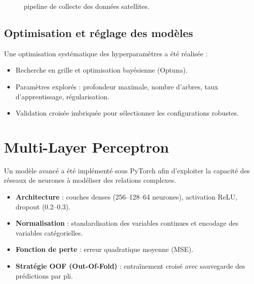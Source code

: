 \documentclass[12pt,a4paper,oneside]{report}
\begin{document}
\begin{figure}[h]


\caption{ pipeline de collecte des données satellites.}
\end{figure}



\subsection{Optimisation et réglage des modèles}
Une optimisation systématique des hyperparamètres a été réalisée :
\begin{itemize}
\item Recherche en grille et optimisation bayésienne (Optuna).
\item Paramètres explorés : profondeur maximale, nombre d’arbres, taux d’apprentissage, régularisation.
\item Validation croisée imbriquée pour sélectionner les configurations robustes.
\end{itemize}

\section{Multi-Layer Perceptron}
Un modèle avancé a été implémenté sous PyTorch afin d’exploiter la capacité des réseaux de neurones à modéliser des relations complexes.
\begin{itemize}
\item \textbf{Architecture} : couches denses (256–128–64 neurones), activation ReLU, dropout (0.2–0.3).
\item \textbf{Normalisation} : standardisation des variables continues et encodage des variables catégorielles.
\item \textbf{Fonction de perte} : erreur quadratique moyenne (MSE).
\item \textbf{Stratégie OOF (Out-Of-Fold)} : entraînement croisé avec sauvegarde des prédictions par pli.
\end{itemize}
\end{document}
